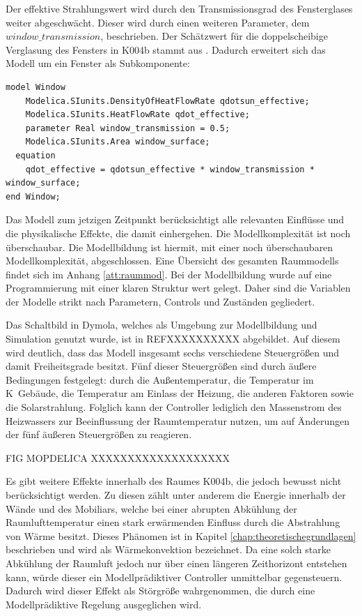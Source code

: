 Der effektive Strahlungswert wird durch den Transmissionsgrad des Fensterglases weiter abgeschwächt. Dieser wird durch einen weiteren Parameter, dem $window\_transmission$, beschrieben. Der Schätzwert für die doppelscheibige Verglasung des Fensters in K004b stammt aus \cite[S.~63]{ha13}. Dadurch erweitert sich das Modell um ein Fenster als Subkomponente:

\begin{lstlisting}[language=Modelica, caption={Fenster als Subkomponente des Raummodells},label=lst:raumdrei]
model Window
	Modelica.SIunits.DensityOfHeatFlowRate qdotsun_effective;
	Modelica.SIunits.HeatFlowRate qdot_effective;
	parameter Real window_transmission = 0.5;
	Modelica.SIunits.Area window_surface;
  equation
  	qdot_effective = qdotsun_effective * window_transmission * window_surface;
end Window;
\end{lstlisting}

Das Modell zum jetzigen Zeitpunkt berücksichtigt alle relevanten Einflüsse und die physikalische Effekte, die damit einhergehen. Die Modellkomplexität ist noch überschaubar. Die Modellbildung ist hiermit, mit einer noch überschaubaren Modellkomplexität, abgeschlossen. Eine Übersicht des gesamten Raummodells findet sich im Anhang \ref{att:raummod}. Bei der Modellbildung wurde auf eine Programmierung mit einer klaren Struktur wert gelegt. Daher sind die Variablen der Modelle strikt nach Parametern, Controls und Zuständen gegliedert.

Das Schaltbild in Dymola, welches als Umgebung zur Modellbildung und Simulation genutzt wurde, ist in REFXXXXXXXXXX abgebildet. Auf diesem wird deutlich, dass das Modell insgesamt sechs verschiedene Steuergrößen und damit Freiheitsgrade besitzt. Fünf dieser Steuergrößen sind durch äußere Bedingungen festgelegt: durch die Außentemperatur, die Temperatur im K~Gebäude, die Temperatur am Einlass der Heizung, die anderen Faktoren sowie die Solarstrahlung. Folglich kann der Controller lediglich den Massenstrom des Heizwassers zur Beeinflussung der Raumtemperatur nutzen, um auf Änderungen der fünf äußeren Steuergrößen zu reagieren. 

FIG MOPDELICA XXXXXXXXXXXXXXXXXXX

Es gibt weitere Effekte innerhalb des Raumes K004b, die jedoch bewusst nicht berücksichtigt werden. Zu diesen zählt unter anderem die Energie innerhalb der Wände und des Mobiliars, welche bei einer abrupten Abkühlung der Raumlufttemperatur einen stark erwärmenden Einfluss durch die Abstrahlung von Wärme besitzt. Dieses Phänomen ist in Kapitel \ref{chap:theoretischegrundlagen} beschrieben und wird als Wärmekonvektion bezeichnet. Da eine solch starke Abkühlung der Raumluft jedoch nur über einen längeren Zeithorizont entstehen kann, würde dieser ein Modellprädiktiver Controller unmittelbar gegensteuern. Dadurch wird dieser Effekt als Störgröße wahrgenommen, die durch eine Modellprädiktive Regelung ausgeglichen wird.


